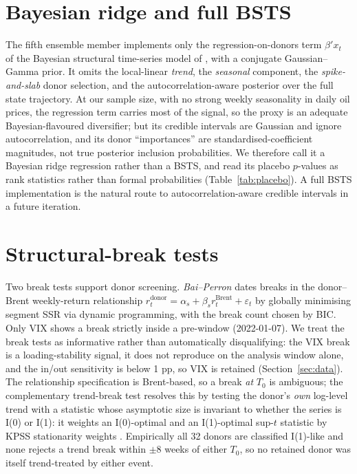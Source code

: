 \documentclass[11pt,a4paper]{article}
\begin{document}
\section{Bayesian ridge and full BSTS}\label{app:bsts}
The fifth ensemble member implements only the regression-on-donors term $\beta'x_t$ of the
Bayesian structural time-series model of \citet{brodersen2015}, with a conjugate
Gaussian--Gamma prior. It omits the local-linear \emph{trend}, the \emph{seasonal}
component, the \emph{spike-and-slab} donor selection, and the autocorrelation-aware
posterior over the full state trajectory. At our sample size, with no strong weekly
seasonality in daily oil prices, the regression term carries most of the signal, so the
proxy is an adequate Bayesian-flavoured diversifier; but its credible intervals are Gaussian
and ignore autocorrelation, and its donor ``importances'' are standardised-coefficient
magnitudes, not true posterior inclusion probabilities. We therefore call it a Bayesian
ridge regression rather than a BSTS, and read its placebo $p$-values as rank statistics
rather than formal probabilities (Table~\ref{tab:placebo}). A full BSTS implementation is the
natural route to autocorrelation-aware credible intervals in a future iteration.

\section{Structural-break tests}\label{app:breaks}
Two break tests support donor screening. \emph{Bai--Perron}
\citep{baiperron1998,baiperron2003} dates breaks in the donor--Brent weekly-return
relationship $r^{\text{donor}}_t=\alpha_s+\beta_s r^{\text{Brent}}_t+\varepsilon_t$ by
globally minimising segment SSR via dynamic programming, with the break count chosen by BIC.
Only VIX shows a break strictly inside a pre-window (2022-01-07). We treat the break tests as
informative rather than automatically disqualifying: the VIX break is a loading-stability
signal, it does not reproduce on the analysis window alone, and the in/out sensitivity is
below 1 pp, so VIX is retained (Section~\ref{sec:data}). The relationship specification is
Brent-based, so a break \emph{at} $T_0$ is ambiguous; the
complementary \citet{harvey2009} trend-break test resolves this by testing the donor's
\emph{own} log-level trend with a statistic whose asymptotic size is invariant to whether the
series is I(0) or I(1): it weights an I(0)-optimal and an I(1)-optimal sup-$t$ statistic by
KPSS stationarity weights \citep{kpss1992}. Empirically all 32 donors are classified I(1)-like
and none rejects a trend break within $\pm$8 weeks of either $T_0$, so no retained donor was
itself trend-treated by either event.
\end{document}
